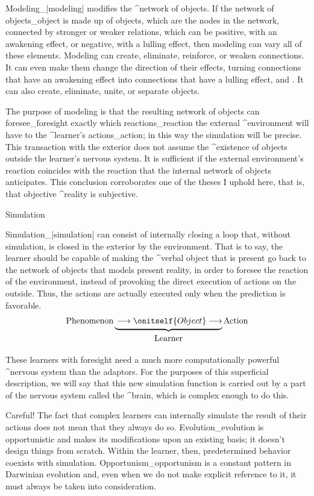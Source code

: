 Modeling_|modeling| modifies the ^{network of objects}. If the network
of objects_{object} is made up of objects, which are the nodes in the
network, connected by stronger or weaker relations, which can be
positive, with an awakening effect, or negative, with a lulling effect,
then modeling can vary all of these elements. Modeling can create,
eliminate, reinforce, or weaken connections. It can even make them
change the direction of their effects, turning connections that have an
awakening effect into connections that have a lulling effect, and
. It can also create, eliminate, unite, or separate
objects.

The purpose of modeling is that the resulting network of objects can
foresee_{foresight} exactly which reactions_{reaction} the external
^{environment} will have to the ^{learner}'s actions_{action}; in this
way the simulation will be precise. This transaction with the exterior
does not assume the ^{existence} of objects outside the learner's
nervous system. It is sufficient if the external environment's reaction
coincides with the reaction that the internal network of objects
anticipates. This conclusion corroborates one of the theses I uphold
here, that is, that objective ^{reality} is subjective.


\Section Simulation

Simulation_|simulation| can consist of internally closing a loop that,
without simulation, is closed in the exterior by the environment. That
is to say, the learner should be capable of making the ^{verbal object}
that is present go back to the network of objects that models present
reality, in order to foresee the reaction of the environment, instead of
provoking the direct execution of actions on the outside. Thus, the
actions are actually executed only when the prediction is favorable.
$$\hbox{Phenomenon}
   \underbrace{\strut
    \longrightarrow
    \onitself{\strut Object}
    \longrightarrow}_{\hbox{\strut Learner}}
  \hbox{Action}
$$

These learners with foresight need a much more computationally powerful
^{nervous system} than the adaptors. For the purposes of this
superficial description, we will say that this new simulation function
is carried out by a part of the nervous system called the ^{brain},
which is complex enough to do this.

Careful!  The fact that complex learners can internally simulate the
result of their actions does not mean that they always do so.
Evolution_{evolution} is opportunistic and makes its modifications upon
an existing basis; it doesn't design things from scratch. Within the
learner, then, predetermined behavior coexists with simulation.
Opportunism_{opportunism} is a constant pattern in Darwinian evolution
and, even when we do not make explicit reference to it, it must always
be taken into consideration.


